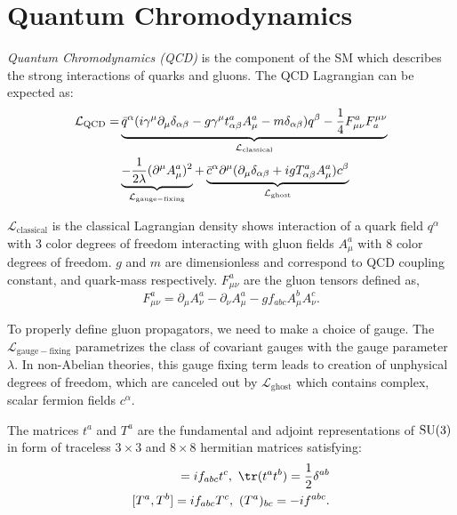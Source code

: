 \section{Quantum Chromodynamics}

\emph{Quantum Chromodynamics (QCD)} is the component of the SM which describes the strong interactions of quarks and gluons. The QCD Lagrangian can be expected as:
\begin{align}
	\mathcal{L}_\mathrm{QCD} = &\underbrace{\bar{q}^\alpha (i \gamma^\mu \partial_\mu\delta_{\alpha\beta} - g\gamma^\mu
	t^a_{\alpha\beta}A^a_\mu - m\delta_{\alpha\beta})q^\beta - \frac{1}{4} F^a_{\mu\nu}F_a^{\mu\nu}}_{\mathcal{L}_\mathrm{classical}}\notag\\ &\underbrace{- \frac{1}{2\lambda}(\partial^\mu A^a_\mu)^2}_{\mathcal{L}_\mathrm{gauge-fixing}}+ \underbrace{\bar{c}^\alpha\partial^\mu(\partial_\mu\delta_{\alpha\beta} + igT^a_{\alpha\beta}A^a_\mu)c^\beta}_{\mathcal{L}_\mathrm{ghost}}
\end{align}

\(\mathcal{L}_\mathrm{classical}\) is the classical Lagrangian density shows interaction of a quark field  \(q^\alpha\) with 3 color degrees of freedom interacting with gluon fields \(A^a_\mu\) with 8 color degrees of freedom. \(g\) and \(m\) are dimensionless and correspond to QCD coupling constant, and quark-mass respectively. \(F^a_{\mu\nu}\) are the gluon tensors defined as,
\begin{equation}
	F^a_{\mu\nu} = \partial_\mu A_\nu^a - \partial_\nu A_\mu^a - gf_{abc}A^b_\mu A^c_\nu.
	\label{eq:gluonFieldTensor}
\end{equation}

To properly define gluon propagators, we need to make a choice of gauge. The \(\mathcal{L}_\mathrm{gauge-fixing}\) parametrizes the class of covariant gauges with the gauge parameter $\lambda$. In non-Abelian theories, this gauge fixing term leads to creation of unphysical degrees of freedom, which are canceled out by \(\mathcal{L}_\mathrm{ghost}\) which contains complex, scalar fermion fields \(c^\alpha\). 

 The matrices \(t^a\) and  \(T^a\) are the fundamental and adjoint representations of \(\rm SU(3)\) in form of traceless \(3\times3\) and \(8\times8\) hermitian matrices satisfying:
\begin{align}
	[t^a, t^b] = if_{abc}t^c,~\tr(t^at^b) = \frac{1}{2}\delta^{ab} \notag\\
	[T^a, T^b] = if_{abc}T^c,~(T^{a})_{bc} = -if^{abc}.
\end{align}

